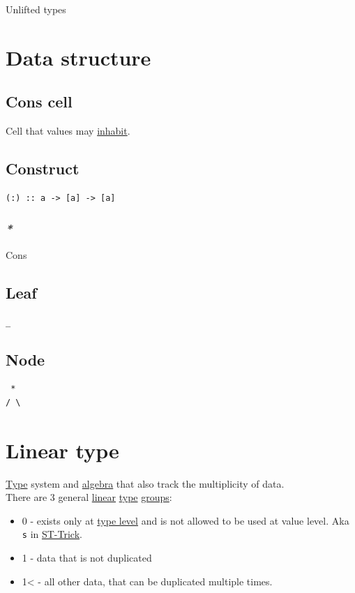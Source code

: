 \documentclass[a4paper,14pt,oneside]{book}
\begin{document}
\label{orgebbc4d0}Unlifted types\\

\section{\label{org8b4a18b}Data structure}
\label{sec:org749042f}
\subsection{\label{org0381533}Cons cell}
\label{sec:org45a234b}
Cell that values may \hyperref[orgddf6f80]{inhabit}.\\

\subsection{\label{org96b225a}Construct}
\label{sec:orga4d4391}
\begin{verbatim}
(:) :: a -> [a] -> [a]
\end{verbatim}

\subsubsection{\emph{*}}
\label{sec:org216f28a}

\label{orgcd911e5}Cons\\

\subsection{\label{orgfc78e94}Leaf}
\label{sec:orga065a43}
\begin{verbatim}
_
\end{verbatim}

\subsection{\label{orgded5d41}Node}
\label{sec:orgfa80335}
\begin{verbatim}
 *
/ \
\end{verbatim}

\section{\label{org6cd08a7}Linear type}
\label{sec:org8b5e41e}
\hyperref[org35b9249]{Type} system and \hyperref[orgf52fcf3]{algebra} that also track the multiplicity of data.\\
There are 3 general \hyperref[org1762823]{linear} \hyperref[org35b9249]{type} \hyperref[org1b6defd]{groups}:\\
\begin{itemize}
\item 0 - exists only at \hyperref[org7fac923]{type level} and is not allowed to be used at value level. Aka \texttt{s} in \hyperref[org5865bd6]{ST-Trick}.\\
\item 1 - data that is not duplicated\\
\item 1< - all other data, that can be duplicated multiple times.\\
\end{itemize}
\end{document}
